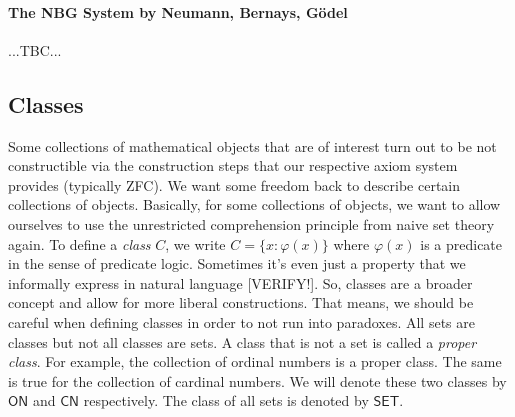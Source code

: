 


\paragraph{The NBG System by Neumann, Bernays, Gödel} ...TBC...







\subsection{Classes}
Some collections of mathematical objects that are of interest turn out to be not constructible via the construction steps that our respective axiom system provides (typically ZFC). We want some freedom back to describe certain collections of objects. Basically, for some collections of objects, we want to allow ourselves to use the unrestricted comprehension principle from naive set theory again. To define a \emph{class} $C$, we write $C = \{x: \varphi(x)\}$ where $\varphi(x)$ is a predicate in the sense of predicate logic. Sometimes it's even just a property that we informally express in natural language [VERIFY!]. So, classes are a broader concept and allow for more liberal constructions. That means, we should be careful when defining classes in order to not run into paradoxes. All sets are classes but not all classes are sets. A class that is not a set is called a \emph{proper class}. For example, the collection of ordinal numbers is a proper class. The same is true for the collection of cardinal numbers. We will denote these two classes by $\mathsf{ON}$ and $\mathsf{CN}$ respectively. The class of all sets is denoted by $\mathsf{SET}$.

